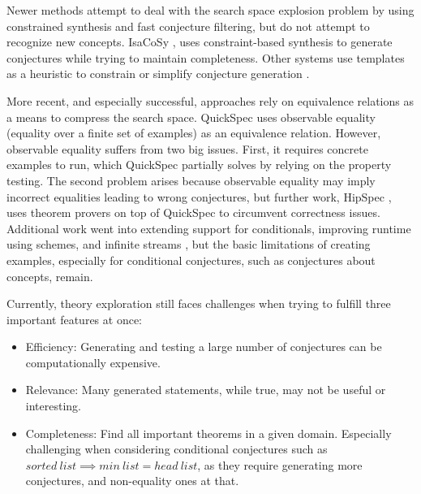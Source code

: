 Newer methods attempt to deal with the search space explosion problem by using constrained synthesis and fast conjecture filtering, but do not attempt to recognize new concepts.
IsaCoSy \cite{JAR2010:Johanssonisacosy}, uses constraint-based synthesis to generate conjectures while trying to maintain completeness.
Other systems use templates as a heuristic to constrain or simplify conjecture generation \cite{einarsdottir2020template,ESA2012:Montanoschemebased,mccasland2006mathsaid}. 

More recent, and especially successful, approaches rely on equivalence relations as a means to compress the search space.
QuickSpec \cite{JFP2017:Smallbonequickspec2, claessen2010quickspec1} uses observable equality (equality over a finite set of examples) as an equivalence relation.
However, observable equality suffers from two big issues.
First, it requires concrete examples to run, which QuickSpec partially solves by relying on the property testing. 
The second problem arises because observable equality may imply incorrect equalities leading to wrong conjectures, but further work, HipSpec \cite{hipster}, uses theorem provers on top of QuickSpec to circumvent correctness issues.
Additional work went into extending support for conditionals, improving runtime using schemes, and infinite streams \cite{ESA2012:Montanoschemebased, hipstercond, einarsdottir2020template, 2018AISC:Einarsdottir}, but the basic limitations of creating examples, especially for conditional conjectures, such as conjectures about concepts, remain.

Currently, theory exploration still faces challenges when trying to fulfill three important features at once:

\begin{itemize}
    \item Efficiency: Generating and testing a large number of conjectures can be computationally expensive.
    \item Relevance: Many generated statements, while true, may not be useful or interesting.
    \item Completeness: Find all important theorems in a given domain. Especially challenging when considering conditional conjectures such as $sorted~list \implies min~list = head~list$, as they require generating more conjectures, and non-equality ones at that.
\end{itemize}

